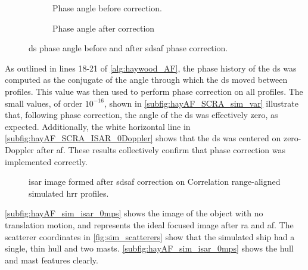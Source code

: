 \documentclass[class=report,11pt,crop=false]{standalone}
\begin{document}
    \begin{figure}[H]
        \centering
        \begin{subfigure}{0.45\linewidth}
            \resizebox{\linewidth}{!}{}
            \caption{Phase angle before correction.} \label{subfig:hayAF_SCRA_sim_DSangle_before}
        \end{subfigure}
        \hspace{1cm}
        \begin{subfigure}{0.45\linewidth}
            \resizebox{\linewidth}{!}{}
            \caption{Phase angle after correction} \label{subfig:hayAF_SCRA_sim_DSangle_after}
        \end{subfigure}
        \caption{\gls{ds} phase angle before and after \gls{sdsaf} phase correction.\label{subfig:hayAF_SCRA_sim_DSangle}}
    \end{figure}

    As outlined in lines 18-21 of \autoref{alg:haywood_AF}, the phase history of the \gls{ds} was computed as the conjugate of the angle through which the \gls{ds} moved between profiles. This value was then used to perform phase correction on all profiles. The small values, of order $10^{-16}$, shown in \autoref{subfig:hayAF_SCRA_sim_var} illustrate that, following phase correction, the angle of the \gls{ds} was effectively zero, as expected. Additionally, the white horizontal line in \autoref{subfig:hayAF_SCRA_ISAR_0Doppler} shows that the \gls{ds} was centered on zero-Doppler after \gls{af}. These results collectively confirm that phase correction was implemented correctly.
    
    \begin{figure}[H]
        \centering
        \resizebox{0.45\linewidth}{!}{}
        \caption{\gls{isar} image formed after \gls{sdsaf} correction on Correlation range-aligned simulated \gls{hrr} profiles.\label{subfig:hayAF_SCRA_ISAR_0Doppler}}
    \end{figure}

    \autoref{subfig:hayAF_sim_isar_0mps} shows the image of the object with no translation motion, and represents the ideal focused image after \gls{ra} and \gls{af}. The scatterer coordinates in \autoref{fig:sim_scatterers} show that the simulated ship had a single, thin hull and two masts. \autoref{subfig:hayAF_sim_isar_0mps} shows the hull and mast features clearly.
\end{document}

